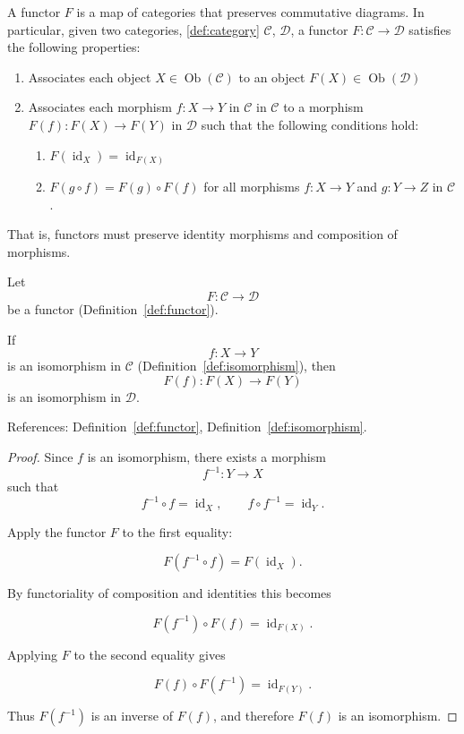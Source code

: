 \begin{definition}[Functor]
\label{def:functor}
  A functor $F$ is a map of categories that preserves commutative diagrams. In particular, given two categories, \ref{def:category} $\mathcal{C}$, $\mathcal{D}$, a functor 
 $F : \mathcal{C} \to \mathcal{D}$ satisfies the following properties:

\begin{enumerate}
  \item Associates each object $X \in \operatorname{Ob}(\mathcal{C})$ to an object $F(X) \in \operatorname{Ob}(\mathcal{D})$ 
  \item Associates each morphism $f : X \to Y$ in $\mathcal{C}$ in $\mathcal{C}$ to a morphism $F(f) : F(X) \to F(Y)$ in $\mathcal{D}$ such that the following conditions hold: 
    \begin{enumerate}
      \item $F(\operatorname{id}_X) = \operatorname{id}_{F(X)}$
      \item $F(g \circ f) = F(g) \circ F(f)$ for all morphisms $f : X \to Y$ and $g : Y \to Z$ in $\mathcal{C}$.  
    \end{enumerate}
\end{enumerate}
That is, functors must preserve identity morphisms and composition of morphisms.
\end{definition}

\begin{lemma}
\label{lem:functor-preserve-iso}

Let 
$$
F : \mathcal{C} \to \mathcal{D}
$$
be a functor (Definition~\ref{def:functor}).  

If
$$
f : X \to Y
$$
is an isomorphism in $\mathcal{C}$ (Definition~\ref{def:isomorphism}),
then
$$
F(f) : F(X) \to F(Y)
$$
is an isomorphism in $\mathcal{D}$.

References: Definition~\ref{def:functor}, Definition~\ref{def:isomorphism}.
\end{lemma}

\begin{proof}

Since $f$ is an isomorphism, there exists a morphism
$$
f^{-1} : Y \to X
$$
such that
$$
f^{-1} \circ f = \operatorname{id}_X,
\qquad
f \circ f^{-1} = \operatorname{id}_Y .
$$

Apply the functor $F$ to the first equality:

$$
F(f^{-1} \circ f) = F(\operatorname{id}_X).
$$

By functoriality of composition and identities this becomes

$$
F(f^{-1}) \circ F(f) = \operatorname{id}_{F(X)}.
$$

Applying $F$ to the second equality gives

$$
F(f) \circ F(f^{-1}) = \operatorname{id}_{F(Y)}.
$$

Thus $F(f^{-1})$ is an inverse of $F(f)$, and therefore $F(f)$ is an isomorphism.
\end{proof}

